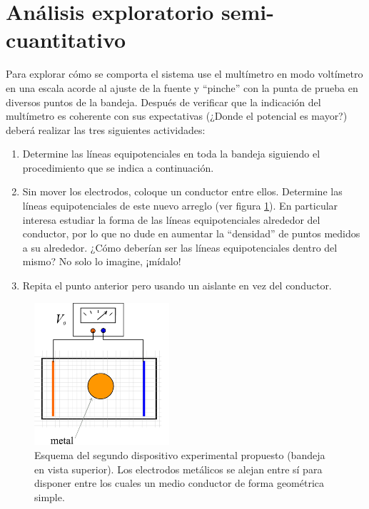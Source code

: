 \documentclass[laboratorio]{guia}
\begin{document}
\section{Análisis exploratorio semi-cuantitativo}
Para explorar cómo se comporta el sistema use el multímetro en modo voltímetro en una escala acorde al ajuste de la fuente y ``pinche'' con la punta de prueba en diversos puntos de la bandeja. 
Después de verificar que la indicación del multímetro es coherente con sus expectativas (¿Donde el potencial es mayor?) deberá realizar las tres siguientes actividades:
\begin{enumerate}
    \item Determine las líneas equipotenciales en toda la bandeja siguiendo el procedimiento que se indica a continuación.
    \item Sin mover los electrodos, coloque un conductor entre ellos.
        Determine las líneas equipotenciales de este nuevo arreglo (ver figura \ref{fig:2}).
		En particular interesa estudiar la forma de las líneas equipotenciales alrededor del conductor, por lo que no dude en aumentar la ``densidad'' de puntos medidos a su alrededor.
		¿Cómo deberían ser las líneas equipotenciales dentro del mismo? No solo lo imagine, ¡mídalo!
    \item Repita el punto anterior pero usando un aislante en vez del conductor.
\end{enumerate}


\begin{figure}[ht!]
  \centering
    \includegraphics[width=5cm]{LG01--001.png}
    \caption{Esquema del segundo dispositivo experimental propuesto (bandeja en vista superior). 
      Los electrodos metálicos se alejan entre sí para disponer entre los cuales un medio conductor de forma geométrica simple. 
    }
    \label{fig:2}
\end{figure}
\end{document}

